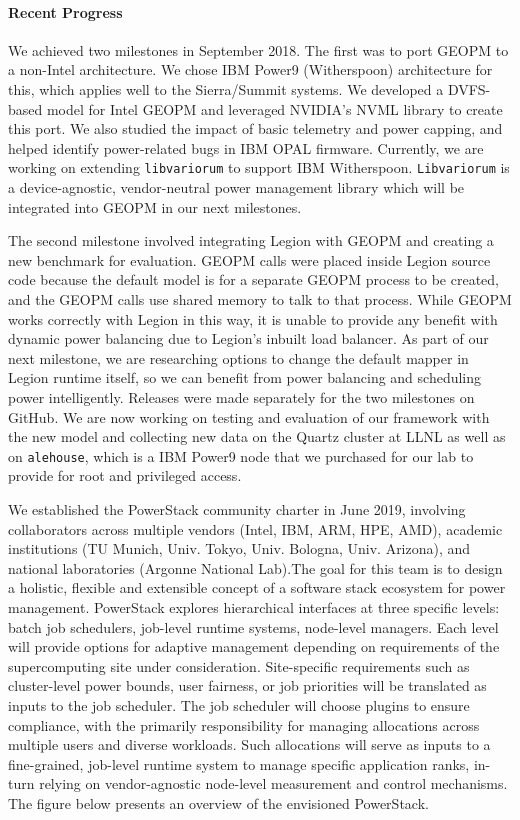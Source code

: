 \paragraph{Recent Progress}
We achieved two milestones in September 2018. The first was to port GEOPM to a non-Intel architecture. We chose IBM Power9 (Witherspoon) architecture for this, which applies well to the Sierra/Summit systems. We developed a DVFS-based model for Intel GEOPM and leveraged NVIDIA's NVML library to create this port. We also studied the impact of basic telemetry and power capping, and helped identify power-related bugs in IBM OPAL firmware. Currently, we are working on extending \texttt{libvariorum} to support IBM Witherspoon. \texttt{Libvariorum} is a device-agnostic, vendor-neutral power management library which will be integrated into GEOPM in our next milestones. 

The second milestone involved integrating Legion with GEOPM and creating a new benchmark for evaluation. GEOPM calls were placed inside Legion source code because the default model is for a separate GEOPM process to be created, and the GEOPM calls use shared memory to talk to that process. While GEOPM works correctly with Legion in this way, it is unable to provide any benefit with dynamic power balancing due to Legion's inbuilt load balancer. As part of our next milestone, we are researching options to change the default mapper in Legion runtime itself, so we can benefit from power balancing and scheduling power intelligently. Releases were made separately for the two milestones on GitHub. We are now working on testing and evaluation of our framework with the new model and collecting new data on the Quartz cluster at LLNL as well as on \texttt{alehouse}, which is a IBM Power9 node that we purchased for our lab to provide for root and privileged access. 

We established the PowerStack community charter in June 2019, involving collaborators across multiple vendors (Intel, IBM, ARM, HPE, AMD), academic institutions (TU Munich, Univ. Tokyo, Univ. Bologna, Univ. Arizona), and national laboratories (Argonne National Lab).The goal for this team is to design a holistic, flexible and extensible concept of a software stack ecosystem for power management. PowerStack explores hierarchical interfaces at three specific levels: batch job schedulers, job-level runtime systems, node-level managers. Each level will provide options for adaptive management depending on requirements of the supercomputing site under consideration. Site-specific requirements such as cluster-level power bounds, user fairness, or job priorities will be translated as inputs to the job scheduler. The job scheduler will choose plugins to ensure compliance, with the primarily responsibility for managing allocations across multiple users and diverse workloads. Such allocations will serve as inputs to a fine-grained, job-level runtime system to manage specific application ranks, in-turn relying on vendor-agnostic node-level measurement and control mechanisms. The figure below presents an overview of the envisioned PowerStack.

